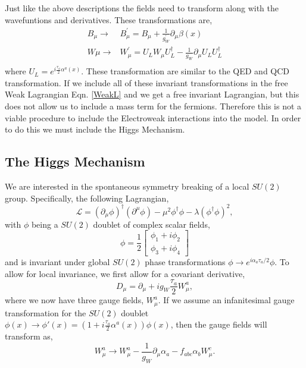  Just like the above descriptions the fields need to transform along with the wavefuntions and derivatives. These transformations are,
\begin{equation}
\begin{split}
B_\mu\rightarrow&B^\prime_\mu=B_\mu+\frac{1}{g_W^\prime}\partial_\mu\beta(x) \\
W\mu\rightarrow&W^\prime_\mu=U_L W_\mu U^\dagger_L-\frac{1}{g_W}\partial_\mu U_L U_L^\dagger \\
\end{split}
\end{equation}
where $U_L=e^{i\frac{\tau_a}{2}\alpha^a(x)}$. These transformation are similar to the QED and QCD transformation. If we include all of these invariant transformations in the free Weak Lagrangian Eqn. \ref{WeakL} and we get a free invariant Lagrangian, but this does not allow us to include a mass term for the fermions. Therefore this is not a viable procedure to include the Electroweak interactions into the model. In order to do this we must include the Higgs Mechanism.

\subsection{The Higgs Mechanism}\label{HiggsMechanism}

We are interested in the spontaneous symmetry breaking of a local $SU(2)$ group. Specifically, the following Lagrangian,
\begin{equation}\label{HiggsLagrangian}
\mathcal{L}=(\partial_\mu\phi)^\dagger(\partial^\mu\phi)-\mu^2\phi^\dagger\phi-\lambda(\phi^\dagger\phi)^2,
\end{equation}
with $\phi$ being a $SU(2)$ doublet of complex scalar fields,
\begin{equation}
\phi=\frac{1}{2}
\begin{bmatrix}
\phi_1+i\phi_2 \\
\phi_3+i\phi_4
\end{bmatrix}
\end{equation} 
and is invariant under global $SU(2)$ phase transformations $\phi\rightarrow e^{i\alpha_a\tau_a/2}\phi$. To allow for local invariance, we first allow for a covariant derivative,
\begin{equation}
D_\mu=\partial_\mu+ig_W \frac{\tau_a}{2}W_\mu^a,
\end{equation}
where we now have three gauge fields, $W_\mu^a$. If we assume an infanitesimal gauge transformation for the $SU(2)$ doublet $\phi(x)\rightarrow\phi'(x)=(1 +i\frac{\tau_a}{2}\alpha^a(x))\phi(x)$, then the gauge fields will transform as,
\begin{equation}\label{HiggVectorTransform}
W^a_\mu\rightarrow W^a_\mu-\frac{1}{g_W}\partial_\mu\alpha_a-f_{abc}\alpha_bW^c_\mu.
\end{equation}

